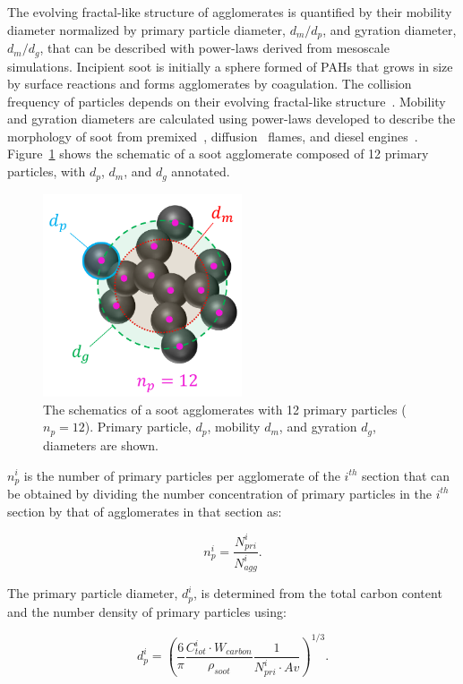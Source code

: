 The evolving fractal-like structure of agglomerates is quantified by their mobility diameter normalized by primary particle diameter, $d_m/d_p$, and gyration diameter, $d_m/d_g$, that can be described with power-laws derived from mesoscale simulations.
Incipient soot is initially a sphere formed of PAHs that grows in size by surface reactions and forms agglomerates by coagulation. The collision frequency of particles depends on their evolving fractal-like structure~\citep{mulholland1988cluster}.
Mobility and gyration diameters are calculated using power-laws developed to describe the morphology of soot from premixed~\citep{abid2008evolution}, diffusion~\citep{yon2015simple} flames, and diesel engines~\citep{rissler2013effective}. Figure~\ref{fig:Morphology} shows the schematic of a soot agglomerate composed of 12 primary particles, with ${d_p}$, ${d_m}$, and ${d_g}$ annotated.
\begin{figure}[!htbp]
	\centering
	\includegraphics[height=60mm, ]{Figures/Theory/Morphology.pdf}
	\caption{The schematics of a soot agglomerates with 12 primary particles (${n_p=12}$). Primary particle, ${d_p}$, mobility ${d_m}$, and gyration ${d_g}$, diameters are shown.}
	\label{fig:Morphology}
\end{figure} 


${n^i_p}$ is the number of primary particles per agglomerate of the ${i^{th}}$ section that can be obtained by dividing the number concentration of primary particles in the ${i^{th}}$ section by that of agglomerates in that section as:


\begin{equation}
	n^i_p = \frac{N^i_{pri}}{N^i_{agg}}
	\label{eqn:n_p}.
\end{equation}

The primary particle diameter, ${d^i_p}$, is determined from the total carbon content and the number density of primary particles using:

\begin{equation}
	d^i_p = \left(\frac{6}{\pi} \frac{C^i_{tot}\cdot W_{carbon}}{\rho_{soot}} \frac{1}{N^i_{pri}\cdot Av} \right)^{1/3}.
	\label{eqn:d_p}
\end{equation}

